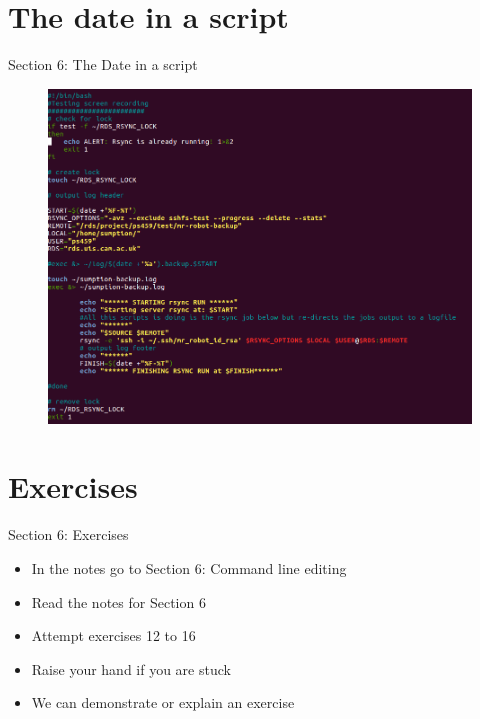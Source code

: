 \section{The date in a script}
\begin{frame}{Section 6: The Date in a script}
\begin{figure}[h]
\includegraphics[height=0.8\textheight]{imgs/script-date.png}
\end{figure}
\end{frame}

\section{Exercises}
\begin{frame}{Section 6: Exercises}
\begin{itemize}
\item In the notes go to {Section 6: Command line editing}
\item Read the notes for Section 6 
\item Attempt exercises 12 to 16
\item Raise your hand if you are stuck
\item We can demonstrate or explain an exercise
\end{itemize}
\end{frame}

